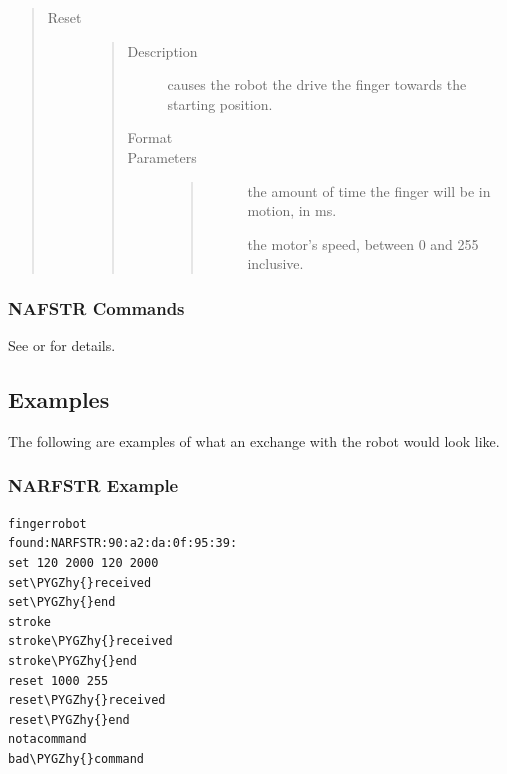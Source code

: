 \documentclass[letterpaper,10pt,english]{sphinxmanual}
\def\PYGZhy{\char`\-}
\begin{document}
\begin{quote}
\begin{description}
\begin{quote}
\begin{description}
\end{description}\end{quote}

\item[{Reset}] \leavevmode\begin{quote}\begin{description}
\item[{Description}] \leavevmode
causes the robot the drive the finger towards the starting position.

\item[{Format}] \leavevmode
{}

\item[{Parameters}] \leavevmode\begin{quote}\begin{description}
\item[{}] \leavevmode
the amount of time the finger will be in motion, in ms.

\item[{}] \leavevmode
the motor's speed, between 0 and 255 inclusive.

\end{description}\end{quote}

\end{description}\end{quote}

\end{description}\end{quote}


\subsubsection{NAFSTR Commands}
\label{Use:nafstr-commands}
See  or  for details.


\subsection{Examples}
\label{Use:examples}
The following are examples of what an exchange with the robot would look like.


\subsubsection{NARFSTR Example}
\label{Use:narfstr-example}
\begin{Verbatim}[commandchars=\\\{\}]
fingerrobot
found:NARFSTR:90:a2:da:0f:95:39:
set 120 2000 120 2000
set\PYGZhy{}received
set\PYGZhy{}end
stroke
stroke\PYGZhy{}received
stroke\PYGZhy{}end
reset 1000 255
reset\PYGZhy{}received
reset\PYGZhy{}end
notacommand
bad\PYGZhy{}command
\end{Verbatim}
\end{document}
